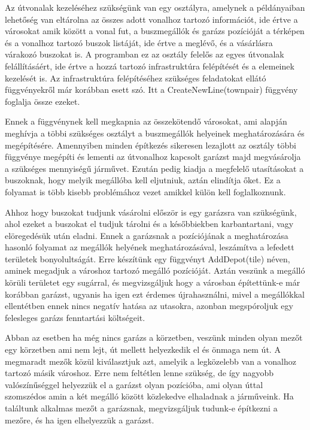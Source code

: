 Az útvonalak kezeléséhez szükségünk van egy osztályra, amelynek a példányaiban lehetőség van eltárolna az összes adott vonalhoz tartozó információt, ide értve a városokat amik között a vonal fut, a buszmegállók és garázs pozícióját a térképen és a vonalhoz tartozó buszok listáját, ide értve a meglévő, és a vásárlásra várakozó buszokat is. A programban ez az osztály felelős az egyes útvonalak felállításáért, ide értve a hozzá tartozó infrastruktúra felépítését és a elemeinek kezelését is. Az infrastruktúra felépítéséhez szükséges feladatokat ellátó függvényekről már korábban esett szó. Itt a CreateNewLine(townpair) függvény foglalja össze ezeket.

Ennek a függvénynek kell megkapnia az összekötendő városokat, ami alapján meghívja a többi szükséges osztályt a buszmegállók helyeinek meghatározására és megépítésére. Amennyiben minden építkezés sikeresen lezajlott az osztály többi függvénye megépíti és lementi az útvonalhoz kapcsolt garázst majd megvásárolja a szükséges mennyiségű járművet. Ezután pedig kiadja a megfelelő utasításokat a buszoknak, hogy melyik megállóba kell eljutniuk, aztán elindítja őket. Ez a folyamat is több kisebb problémához vezet amikkel külön kell foglalkoznunk.

Ahhoz hogy buszokat tudjunk vásárolni először is egy garázsra van szükségünk, ahol ezeket a buszokat el tudjuk tárolni és a későbbiekben karbantartani, vagy elöregedésük után eladni. Ennek a garázsnak a pozíciójának a meghatározása hasonló folyamat az megállók helyének meghatározásával, leszámítva a lefedett területek bonyolultságát. Erre készítünk egy függvényt AddDepot(tile) néven, aminek megadjuk a városhoz tartozó megálló pozícióját. Aztán veszünk a megálló körüli területet egy sugárral, és megvizsgáljuk hogy a városban építettünk-e már korábban garázst, ugyanis ha igen ezt érdemes újrahasználni, mivel a megállókkal ellentétben ennek nincs negatív hatása az utasokra, azonban megspóroljuk egy felesleges garázs fenntartási költségeit.

Abban az esetben ha még nincs garázs a körzetben, veszünk minden olyan mezőt egy körzetben ami nem lejt, út mellett helyezkedik el és önmaga nem út. A megmaradt mezők közül kiválasztjuk azt, amelyik a legközelebb van a vonalhoz tartozó másik városhoz. Erre nem feltétlen lenne szükség, de így nagyobb valószínűséggel helyezzük el a garázst olyan pozícióba, ami olyan úttal szomszédos amin a két megálló között közlekedve elhaladnak a járműveink. Ha találtunk alkalmas mezőt a garázsnak, megvizsgáljuk tudunk-e építkezni a mezőre, és ha igen elhelyezzük a garázst.

